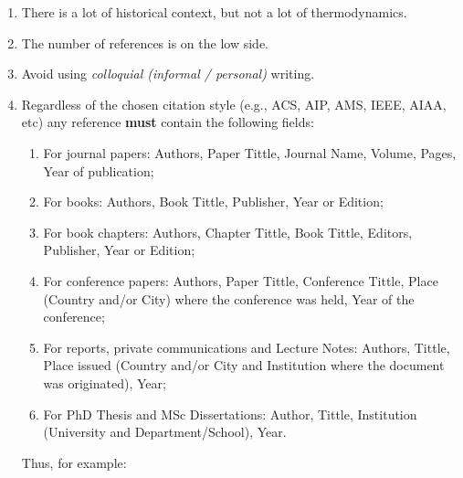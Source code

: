 \documentclass[14pt,twoside]{report}
\begin{document}
\begin{enumerate}
\begin{enumerate}
%
\item There is a lot of historical context, but not a lot of thermodynamics.
%
\item The number of references is on the low side.
%
%
\item Avoid using {\it colloquial (informal / personal)} writing.
%
\item Regardless of the chosen citation style (e.g., ACS, AIP, AMS, IEEE, AIAA, etc) any reference {\bf must} contain the following fields: 
\begin{enumerate}
\item For journal papers: Authors, Paper Tittle, Journal Name, Volume, Pages, Year of publication;
\item For books: Authors, Book Tittle, Publisher, Year or Edition;
\item For book chapters: Authors, Chapter Tittle, Book Tittle, Editors, Publisher, Year or Edition;
\item For conference papers: Authors, Paper Tittle, Conference Tittle, Place (Country and/or City) where the conference was held, Year of the conference;
\item For reports,  private communications and Lecture Notes: Authors, Tittle, Place issued (Country and/or City and Institution where the document was originated), Year;
\item For PhD Thesis and MSc Dissertations: Author, Tittle, Institution (University and Department/School), Year.
\end{enumerate}  
Thus, for example:
%
\end{enumerate}


\end{enumerate}
\end{document}
